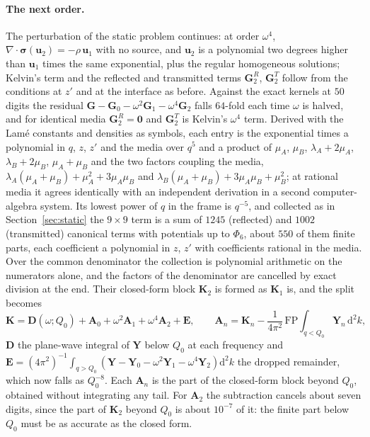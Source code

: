 \documentclass[11pt,a4paper]{article}
\newcommand{\bK}{\mathbf{K}}
\newcommand{\dd}{\mathrm{d}}
\begin{document}
\paragraph{The next order.} The perturbation of the static problem continues: at order $\omega^4$,
$\nabla\cdot\boldsymbol\sigma(\mathbf u_2)=-\rho\,\mathbf u_1$ with no source, and $\mathbf u_2$ is a polynomial
two degrees higher than $\mathbf u_1$ times the same exponential, plus the regular homogeneous solutions; Kelvin's
term and the reflected and transmitted terms $\mathbf G^{R}_2$, $\mathbf G^{T}_2$ follow from the conditions at
$z'$ and at the interface as before. Against the exact kernels at $50$ digits the residual
$\mathbf G-\mathbf G_0-\omega^2\mathbf G_1-\omega^4\mathbf G_2$ falls $64$-fold each time $\omega$ is halved, and for
identical media $\mathbf G^{R}_2=\mathbf 0$ and $\mathbf G^{T}_2$ is Kelvin's $\omega^4$ term. Derived with the Lam\'e
constants and densities as symbols, each entry is the exponential times a polynomial in $q$, $z$, $z'$ and the
media over $q^5$ and a product of $\mu_A$, $\mu_B$, $\lambda_A+2\mu_A$, $\lambda_B+2\mu_B$, $\mu_A+\mu_B$ and the two
factors coupling the media, $\lambda_A(\mu_A+\mu_B)+\mu_A^2+3\mu_A\mu_B$ and $\lambda_B(\mu_A+\mu_B)+3\mu_A\mu_B+\mu_B^2$; at
rational media it agrees identically with an independent derivation in a second computer-algebra system. Its lowest power of
$q$ in the frame is $q^{-5}$, and collected as in Section~\ref{sec:static} the $9\times9$ term is a sum of $1245$
(reflected) and $1002$ (transmitted) canonical terms with potentials up to $\Phi_6$, about $550$ of them finite
parts, each coefficient a polynomial in $z$, $z'$ with coefficients rational in the media. Over the common
denominator the collection is polynomial arithmetic on the numerators alone, and the factors of the denominator
are cancelled by exact division at the end. Their closed-form block $\bK_2$ is formed as $\bK_1$ is, and the split becomes
\begin{equation}\label{eq:omega4split}
  \bK=\mathbf D(\omega;Q_0)+\mathbf A_0+\omega^2\mathbf A_1+\omega^4\mathbf A_2+\mathbf E,\qquad
  \mathbf A_n=\bK_n-\frac{1}{4\pi^2}\,\mathrm{FP}\!\int_{q<Q_0}\mathbf Y_n\,\dd^2k,
\end{equation}
$\mathbf D$ the plane-wave integral of $\mathbf Y$ below $Q_0$ at each frequency and
$\mathbf E=(4\pi^2)^{-1}\int_{q>Q_0}(\mathbf Y-\mathbf Y_0-\omega^2\mathbf Y_1-\omega^4\mathbf Y_2)\dd^2k$ the dropped
remainder, which now falls as $Q_0^{-8}$. Each $\mathbf A_n$ is the part of the closed-form block beyond $Q_0$,
obtained without integrating any tail. For $\mathbf A_2$ the subtraction cancels about seven digits, since the
part of $\bK_2$ beyond $Q_0$ is about $10^{-7}$ of it: the finite part below $Q_0$ must be as accurate as the closed
form.
\end{document}
